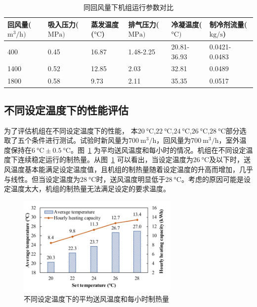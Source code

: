 \begin{table}[ht]
	\centering
	\caption{同回风量下机组运行参数对比}
	\begin{tabular}{@{}llllll@{}}
		\toprule
		回风量($\unit{\m^3/\hour}) $ & 吸入压力($\unit{\MPa}) $ & 蒸发温度($\unit{\degreeCelsius} $) & 排气压力($\unit{\MPa}) $ & 冷凝温度($\unit{\degreeCelsius}) $ & 制冷剂流量($\unit{\kg/\s} $) \\ \midrule
		400 & 0.45 & 16.87 & 1.48-2.25 & 20.81-36.93 & 0.0421-0.0483 \\
		1400 & 0.52 & 12.85 & 2.03 & 32.81 & 0.0489 \\
		1800 & 0.58 & 9.73 & 2.11 & 35.35 & 0.0517 \\ \bottomrule
	\end{tabular}
	\label{T:4}
\end{table}

\subsection{不同设定温度下的性能评估}
为了评估机组在不同设定温度下的性能，
本$\qty{20}{\degreeCelsius} $,$\qty{22}{\degreeCelsius} $,$\qty{24}{\degreeCelsius} $,$\qty{26}{\degreeCelsius}$,$\qty{28}{\degreeCelsius} $部分选取了五个条件进行测试。试验时新风量为$\qty{700}{\m^3/\hour} $，回风量为$\qty{700}{\m^3/\hour} $，室外温度保持在$\qty{6}{\degreeCelsius} \pm \qty{0.5}{\degreeCelsius} $。图~\ref{F:17} 为平均送风温度和每小时的情况。机组在不同设定温度下连续稳定运行的制热量。从图~\ref{F:17} 可以看出，当设定温度为$\qty{26}{\degreeCelsius} $及以下时，送风温度基本能满足设定温度值，且机组的制热量随着设定温度的升高而增加，几乎与线性。但当设定温度为$\qty{28}{\degreeCelsius} $时，送风温度明显低于$\qty{28}{\degreeCelsius} $。考虑的原因可能是设定温度太大，机组的制热量无法满足设定的要求温度。

\begin{figure}[htbp]
	\centering
	\includegraphics[width=0.7\textwidth]{figure/figure_17}
	\caption{不同设定温度下的平均送风温度和每小时制热量}
	\label{F:17}
\end{figure}

